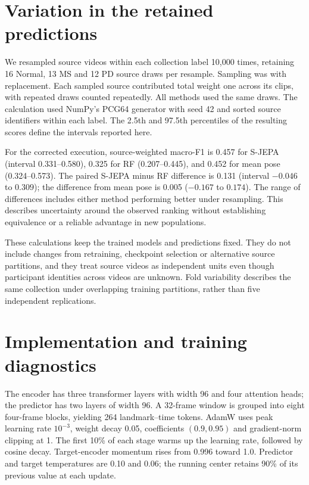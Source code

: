 \section{Variation in the retained predictions}
We resampled source videos within each collection label 10,000 times, retaining 16 Normal, 13 MS and 12 PD source draws per resample. Sampling was with replacement. Each sampled source contributed total weight one across its clips, with repeated draws counted repeatedly. All methods used the same draws. The calculation used NumPy's PCG64 generator with seed 42 and sorted source identifiers within each label. The 2.5th and 97.5th percentiles of the resulting scores define the intervals reported here.

For the corrected execution, source-weighted macro-F1 is 0.457 for S-JEPA (interval 0.331--0.580), 0.325 for RF (0.207--0.445), and 0.452 for mean pose (0.324--0.573). The paired S-JEPA minus RF difference is 0.131 (interval $-0.046$ to $0.309$); the difference from mean pose is 0.005 ($-0.167$ to $0.174$). The range of differences includes either method performing better under resampling. This describes uncertainty around the observed ranking without establishing equivalence or a reliable advantage in new populations.

These calculations keep the trained models and predictions fixed. They do not include changes from retraining, checkpoint selection or alternative source partitions, and they treat source videos as independent units even though participant identities across videos are unknown. Fold variability describes the same collection under overlapping training partitions, rather than five independent replications.

\section{Implementation and training diagnostics}
The encoder has three transformer layers with width 96 and four attention heads; the predictor has two layers of width 96. A 32-frame window is grouped into eight four-frame blocks, yielding 264 landmark--time tokens. AdamW uses peak learning rate $10^{-3}$, weight decay 0.05, coefficients $(0.9,0.95)$ and gradient-norm clipping at 1. The first 10\% of each stage warms up the learning rate, followed by cosine decay. Target-encoder momentum rises from 0.996 toward 1.0. Predictor and target temperatures are 0.10 and 0.06; the running center retains 90\% of its previous value at each update.

